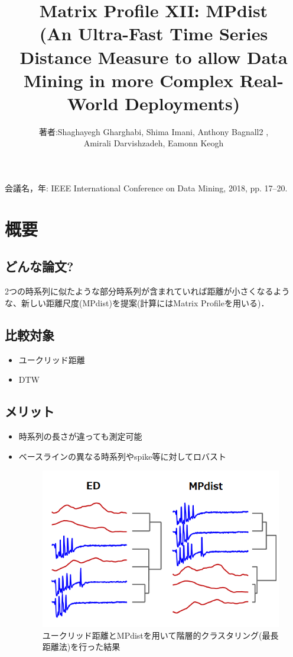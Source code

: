 \documentclass{jsarticle}
\begin{document}
\title{ Matrix Profile XII: MPdist \\(An Ultra-Fast Time Series Distance Measure to
	allow Data Mining in more Complex Real-World
	Deployments)}
\author{著者:Shaghayegh Gharghabi, Shima Imani, Anthony Bagnall2
	,\\ Amirali Darvishzadeh, Eamonn Keogh
}
\date{}
\maketitle
会議名，年: IEEE International Conference on Data Mining, 2018, pp. 17–20.

\section{概要}
\subsection{どんな論文?}
2つの時系列に似たような部分時系列が含まれていれば距離が小さくなるような、新しい距離尺度(MPdist)を提案(計算にはMatrix Profileを用いる)．
\subsection{比較対象}
\begin{itemize}
	\item ユークリッド距離
	\item DTW
\end{itemize}

\subsection{メリット}
\begin{itemize}
	\item 時系列の長さが違っても測定可能
	\item ベースラインの異なる時系列やspike等に対してロバスト
	\begin{figure}[h!]
		\begin{center}
			\includegraphics[scale = 0.5]{MPdist_fig2.png}
		\end{center}
		\caption{ユークリッド距離とMPdistを用いて階層的クラスタリング(最長距離法)を行った結果}
	\end{figure}
\end{itemize}
\end{document}
